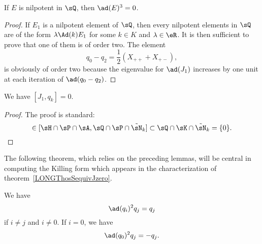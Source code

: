 \begin{proposition}			\label{LONGEtOrdreDeux}
	If $E$ is nilpotent in $\sQ$, then $\ad(E)^3=0$.
\end{proposition}

\begin{proof}
	If $E_1$ is a nilpotent element of $\sQ$, then every nilpotent elements in $\sQ$ are of the form $\lambda\Ad(k)E_1$ for some $k\in K$ and $\lambda\in\eR$\cite{These}. It is then sufficient to prove that one of them is of order two. The element
	\begin{equation}		\label{LONGEqDecqzmoinsqDeux}
		q_0-q_2=\frac{ 1 }{2}(X_{++}+X_{+-}),
	\end{equation}
	is obviously of order two because the eigenvalue for $\ad(J_1)$ increases by one unit at each iteration of $\ad(q_0-q_2)$.
\end{proof}

\begin{lemma}
	We have $[J_1,q_k]=0$.
\end{lemma}

\begin{proof}
	The proof is standard:
	\begin{equation}
		[J_1,q_k]\in[\sH\cap\sP\cap\sA,\sQ\cap\sP\cap\tilde\sN_k]\subset\sQ\cap\sK\cap\tilde\sN_k=\{ 0 \}.
	\end{equation}
\end{proof}

The following theorem, which relies on the preceding lemmas, will be central in computing the Killing form which appears in the characterization of theorem~\ref{LONGThosSequivJzero}.
%
\begin{theorem}			\label{LONGThoAdESqqq}
	We have
	\begin{equation}
		\ad(q_i)^2q_j=q_j
	\end{equation}
	if $i\neq j$ and $i\neq 0$. If $i=0$, we have
	\begin{equation}
		\ad(q_0)^2q_j=-q_j.
	\end{equation}
\end{theorem}


